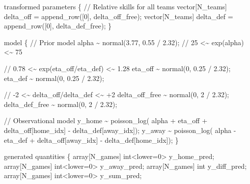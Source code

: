\documentclass[
  letterpaper,
  DIV=11,
  numbers=noendperiod]{scrartcl}
\newenvironment{Shaded}{\begin{snugshade}}{\end{snugshade}}
\newcommand{\CommentTok}[1]{\textcolor[rgb]{0.37,0.37,0.37}{#1}}
\newcommand{\DataTypeTok}[1]{\textcolor[rgb]{0.68,0.00,0.00}{#1}}
\newcommand{\DecValTok}[1]{\textcolor[rgb]{0.68,0.00,0.00}{#1}}
\newcommand{\FloatTok}[1]{\textcolor[rgb]{0.68,0.00,0.00}{#1}}
\newcommand{\KeywordTok}[1]{\textcolor[rgb]{0.00,0.23,0.31}{#1}}
\newcommand{\NormalTok}[1]{\textcolor[rgb]{0.00,0.23,0.31}{#1}}
\begin{document}
\begin{codelisting}
\begin{Shaded}
\begin{Highlighting}[]
\KeywordTok{transformed parameters}\NormalTok{ \{}
  \CommentTok{// Relative skills for all teams}
  \DataTypeTok{vector}\NormalTok{[N\_teams] delta\_off = append\_row([}\DecValTok{0}\NormalTok{]\textquotesingle{}, delta\_off\_free);}
  \DataTypeTok{vector}\NormalTok{[N\_teams] delta\_def = append\_row([}\DecValTok{0}\NormalTok{]\textquotesingle{}, delta\_def\_free);}
\NormalTok{\}}

\KeywordTok{model}\NormalTok{ \{}
  \CommentTok{// Prior model}
\NormalTok{  alpha \textasciitilde{} normal(}\FloatTok{3.77}\NormalTok{, }\FloatTok{0.55}\NormalTok{ / }\FloatTok{2.32}\NormalTok{); }\CommentTok{// 25 \textless{}\textasciitilde{}  exp(alpha) \textless{}\textasciitilde{} 75}

  \CommentTok{// 0.78 \textless{}\textasciitilde{} exp(eta\_off/eta\_def) \textless{}\textasciitilde{} 1.28}
\NormalTok{  eta\_off \textasciitilde{} normal(}\DecValTok{0}\NormalTok{, }\FloatTok{0.25}\NormalTok{ / }\FloatTok{2.32}\NormalTok{);}
\NormalTok{  eta\_def \textasciitilde{} normal(}\DecValTok{0}\NormalTok{, }\FloatTok{0.25}\NormalTok{ / }\FloatTok{2.32}\NormalTok{);}

  \CommentTok{// {-}2 \textless{}\textasciitilde{} delta\_off/delta\_def \textless{}\textasciitilde{} +2}
\NormalTok{  delta\_off\_free \textasciitilde{} normal(}\DecValTok{0}\NormalTok{, }\DecValTok{2}\NormalTok{ / }\FloatTok{2.32}\NormalTok{);}
\NormalTok{  delta\_def\_free \textasciitilde{} normal(}\DecValTok{0}\NormalTok{, }\DecValTok{2}\NormalTok{ / }\FloatTok{2.32}\NormalTok{);}

  \CommentTok{// Observational model}
\NormalTok{  y\_home \textasciitilde{} poisson\_log(  alpha + eta\_off}
\NormalTok{                       + delta\_off[home\_idx] {-} delta\_def[away\_idx]);}
\NormalTok{  y\_away \textasciitilde{} poisson\_log(  alpha {-} eta\_def}
\NormalTok{                       + delta\_off[away\_idx] {-} delta\_def[home\_idx]);}
\NormalTok{\}}

\KeywordTok{generated quantities}\NormalTok{ \{}
  \DataTypeTok{array}\NormalTok{[N\_games] }\DataTypeTok{int}\NormalTok{\textless{}}\KeywordTok{lower}\NormalTok{=}\DecValTok{0}\NormalTok{\textgreater{} y\_home\_pred;}
  \DataTypeTok{array}\NormalTok{[N\_games] }\DataTypeTok{int}\NormalTok{\textless{}}\KeywordTok{lower}\NormalTok{=}\DecValTok{0}\NormalTok{\textgreater{} y\_away\_pred;}
  \DataTypeTok{array}\NormalTok{[N\_games] }\DataTypeTok{int}\NormalTok{ y\_diff\_pred;}
  \DataTypeTok{array}\NormalTok{[N\_games] }\DataTypeTok{int}\NormalTok{\textless{}}\KeywordTok{lower}\NormalTok{=}\DecValTok{0}\NormalTok{\textgreater{} y\_sum\_pred;}


\end{Highlighting}
\end{Shaded}
\end{codelisting}
\end{document}
